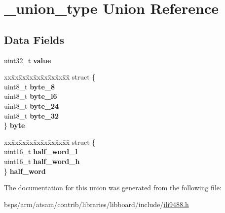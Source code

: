 \hypertarget{union__union__type}{}\section{\+\_\+union\+\_\+type Union Reference}
\label{union__union__type}
\subsection*{Data Fields}
\begin{DoxyCompactItemize}
\item 
\mbox{\label{union__union__type_a704b1de18b42ae385a0e1f1421095837}} 
uint32\+\_\+t {\bfseries value}
\item 
\mbox{\label{union__union__type_a7648b9685486949c0022ea7f2009ebb9}} 
\begin{tabbing}
xx\=xx\=xx\=xx\=xx\=xx\=xx\=xx\=xx\=\kill
struct \{\\
\>uint8\_t {\bfseries byte\_8}\\
\>uint8\_t {\bfseries byte\_l6}\\
\>uint8\_t {\bfseries byte\_24}\\
\>uint8\_t {\bfseries byte\_32}\\
\} {\bfseries byte}\\

\end{tabbing}\item 
\mbox{\label{union__union__type_afc6ad759185effa4bd22be7b94975d6c}} 
\begin{tabbing}
xx\=xx\=xx\=xx\=xx\=xx\=xx\=xx\=xx\=\kill
struct \{\\
\>uint16\_t {\bfseries half\_word\_l}\\
\>uint16\_t {\bfseries half\_word\_h}\\
\} {\bfseries half\_word}\\

\end{tabbing}\end{DoxyCompactItemize}


The documentation for this union was generated from the following file\+:\begin{DoxyCompactItemize}
\item 
bsps/arm/atsam/contrib/libraries/libboard/include/\mbox{\hyperlink{ili9488_8h}{ili9488.\+h}}\end{DoxyCompactItemize}
